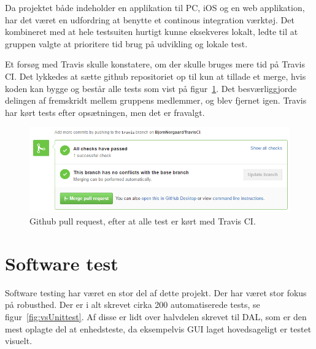 Da projektet både indeholder en applikation til PC, iOS og en web applikation, har det været en udfordring at benytte et continous integration værktøj.
Det kombineret med at hele testsuiten hurtigt kunne eksekveres lokalt, ledte til at gruppen valgte at prioritere tid brug på udvikling og lokale test.

Et forsøg med Travis skulle konstatere, om der skulle bruges mere tid på Travis CI. 
Det lykkedes at sætte github repositoriet op til kun at tillade et merge, hvis koden kan bygge og består alle tests som vist på figur~\ref{fig:travisgithubsuccess}.
Det besværliggjorde delingen af fremskridt mellem gruppens medlemmer, og blev fjernet igen.
Travis har kørt tests efter opsætningen, men det er fravalgt.

\begin{figure}[h]
	\centering
	\includegraphics[width=0.8\linewidth]{figs/processProjektGennemforsel/travis/travisgithubsuccess}
	\caption{Github pull request, efter at alle test er kørt med Travis CI.}
	\label{fig:travisgithubsuccess}
\end{figure}

\section{Software test}
Software testing har været en stor del af dette projekt. Der har været stor fokus på robusthed. Der er i alt skrevet cirka 200 automatiserede tests, se figur~\ref{fig:vsUnittest}. Af disse er lidt over halvdelen skrevet til DAL, som er den mest oplagte del at enhedsteste, da eksempelvis GUI laget hovedsageligt er testet visuelt.